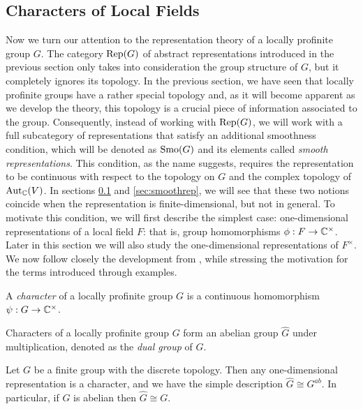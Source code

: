 \subsection{Characters of Local Fields}\label{sec:chars}

Now we turn our attention to the representation theory of a locally profinite group $G$. The category $\mathrm{Rep}(G)$ of abstract representations introduced in the previous section only takes into consideration the group structure of $G$, but it completely ignores its topology. In the previous section, we have seen that locally profinite groups have a rather special topology and, as it will become apparent as we develop the theory, this topology is a crucial piece of information associated to the group. Consequently, instead of working with $\mathrm{Rep}(G)$, we will work with a full subcategory of representations that satisfy an additional smoothness condition, which will be denoted as $\mathrm{Smo}(G)$ and its elements called \textit{smooth representations}. This condition, as the name suggests, requires the representation to be continuous with respect to the topology on $G$ and the complex topology of $\mathrm{Aut}_{\mathbb{C}}(V)$. In sections \ref{sec:chars} and \ref{sec:smoothrep}, we will see that these two notions coincide when the representation is finite-dimensional, but not in general. To motivate this condition, we will first describe the simplest case: one-dimensional representations of a local field $F$: that is, group homomorphisms $\phi:F\rightarrow\mathbb{C}^{\times}$. Later in this section we will also study the one-dimensional representations of $F^{\times}$. We now follow closely the development from \cite[\S 2]{BH1}, while stressing the motivation for the terms introduced through examples.

\begin{defn}
    A \textit{character} of a locally profinite group $G$ is a continuous homomorphism $\psi:G\rightarrow\mathbb{C}^{\times}$.
\end{defn}

Characters of a locally profinite group $G$ form an abelian group $\hat{G}$ under multiplication, denoted as the \textit{dual group} of $G$. 

\begin{example}
    Let $G$ be a finite group with the discrete topology. Then any one-dimensional representation is a character, and we have the simple description $\hat{G}\cong G^{ab}$. In particular, if $G$ is abelian then $\hat{G}\cong G$.
\end{example}

